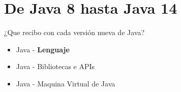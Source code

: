 \documentclass[aspectratio=169]{beamer}
\begin{document}
{
    \section{De Java 8 hasta Java 14}
}



\begin{frame}[fragile]{¿Que recibo con cada versión nueva de Java?}
	\begin{itemize}
		\item Java - \textbf{Lenguaje}
		\item Java - Bibliotecas e APIs
		\item Java - Maquina Virtual de Java
	\end{itemize}	
\end{frame}
\end{document}
